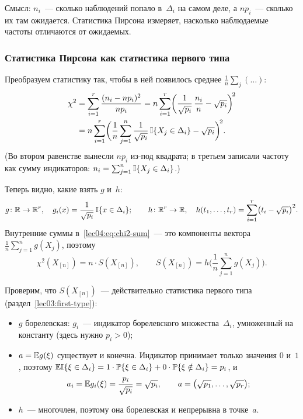 Смысл: $n_i$~--- сколько наблюдений попало в~$\Delta_i$ на самом деле, а $n p_i$~---
сколько их там ожидается. Статистика Пирсона измеряет, насколько наблюдаемые частоты
отличаются от ожидаемых.

\subsubsection{Статистика Пирсона как статистика первого типа}

Преобразуем статистику так, чтобы в ней появилось среднее $\frac1n \sum_j (\ldots)$:
\begin{align}
  \chi^2
  &= \sum_{i=1}^{r} \frac{(n_i - np_i)^2}{np_i}
   = n \sum_{i=1}^{r} \biggl(\frac{1}{\sqrt{p_i}}\,\frac{n_i}{n} - \sqrt{p_i}\biggr)^{\!2} \notag \\
  &= n \sum_{i=1}^{r} \biggl(\frac{1}{n} \sum_{j=1}^{n} \frac{1}{\sqrt{p_i}}\,
     \mathbb{I}\{X_j \in \Delta_i\} - \sqrt{p_i}\biggr)^{\!2}.
  \label{lec04:eq:chi2-sum}
\end{align}
(Во втором равенстве вынесли $n p_i$ из-под квадрата; в третьем записали частоту как сумму
индикаторов: $n_i = \sum_{j=1}^n \mathbb{I}\{X_j \in \Delta_i\}$.)

Теперь видно, какие взять $g$ и~$h$:
\[
  g \colon \mathbb{R} \to \mathbb{R}^r, \quad g_i(x) = \frac{1}{\sqrt{p_i}}\, \mathbb{I}\{x \in \Delta_i\};
  \qquad
  h \colon \mathbb{R}^r \to \mathbb{R}, \quad h(t_1, \ldots, t_r) = \sum_{i=1}^{r} \bigl(t_i - \sqrt{p_i}\bigr)^2.
\]
Внутренние суммы в~\cref{lec04:eq:chi2-sum}~--- это компоненты вектора
$\frac1n \sum_{j=1}^n g(X_j)$, поэтому
\begin{equation}
  \label{lec04:eq:chi2-nS}
  \chi^2(X_{[n]}) = n \cdot S(X_{[n]}), \qquad
  S(X_{[n]}) = h\biggl(\frac{1}{n} \sum_{j=1}^{n} g(X_j)\biggr).
\end{equation}

Проверим, что $S(X_{[n]})$~--- действительно статистика первого типа
(раздел~\ref{lec03:first-type}):
\begin{itemize}
  \item $g$ борелевская: $g_i$~--- индикатор борелевского множества~$\Delta_i$,
        умноженный на константу (здесь нужно $p_i > 0$);
  \item $a = \mathbb{E} g(\xi)$ существует и конечна. Индикатор принимает только значения
        $0$ и~$1$, поэтому $\mathbb{E}\mathbb{I}\{\xi \in \Delta_i\} = 1 \cdot \mathbb{P}\{\xi \in \Delta_i\}
        + 0 \cdot \mathbb{P}\{\xi \notin \Delta_i\} = p_i$, и
        \[
          a_i = \mathbb{E} g_i(\xi) = \frac{p_i}{\sqrt{p_i}} = \sqrt{p_i},
          \qquad a = \bigl(\sqrt{p_1}, \ldots, \sqrt{p_r}\bigr);
        \]
  \item $h$~--- многочлен, поэтому она борелевская и непрерывна в точке~$a$.
\end{itemize}

